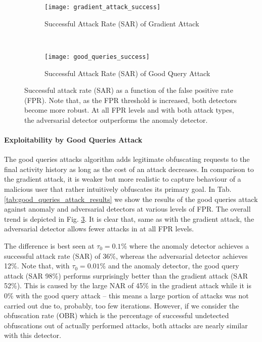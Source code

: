 \begin{figure}[h]
    \centering

    \begin{subfigure}[b]{0.45\textwidth}
        \texttt{[image: gradient\_attack\_success]}
        \caption{Successful Attack Rate (SAR) of Gradient Attack}
        \label{fig:gradient-attack-fpr-sar}
    \end{subfigure}
    ~
    \begin{subfigure}[b]{0.45\textwidth}
        \texttt{[image: good\_queries\_success]}
        \caption{Successful Attack Rate (SAR) of Good Query Attack}
        \label{fig:good_queries-attack-fpr-sar}
    \end{subfigure}


    \caption{Successful attack rate (SAR) as a function of the false positive rate (FPR). Note that, as the FPR threshold is increased, both detectors become more robust. At all FPR levels and with both attack types, the adversarial detector outperforms the anomaly detector.}

\end{figure}

\paragraph{Exploitability by Good Queries Attack}
The good queries attacks algorithm adds legitimate obfuscating requests to the final activity history as long as the cost of an attack decreases. In comparison to the gradient attack, it is weaker but more realistic to capture behaviour of a malicious user that rather intuitively obfuscates its primary goal. In Tab. \ref{tab:good_queries_attack_results} we show the results of the good queries attack against anomaly and adversarial detectors at various levels of FPR. The overall trend is depicted in Fig. \ref{fig:good_queries-attack-fpr-sar}. It is clear that, same as with the gradient attack, the adversarial detector allows fewer attacks in at all FPR levels.

The difference is best seen at $\tau_0 = 0.1\%$ where the anomaly detector achieves a successful attack rate (SAR) of 36\%, whereas the adversarial detector achieves 12\%. Note that, with $\tau_0 = 0.01\%$ and the anomaly detector, the good query attack (SAR 98\%) performs surprisingly better than the gradient attack (SAR 52\%). This is caused by the large NAR of 45\% in the gradient attack while it is 0\% with the good query attack -- this means a large portion of attacks was not carried out due to, probably, too few iterations. However, if we consider the obfuscation rate (OBR) which is the percentage of successful undetected obfuscations out of actually performed attacks, both attacks are nearly similar with this detector.


